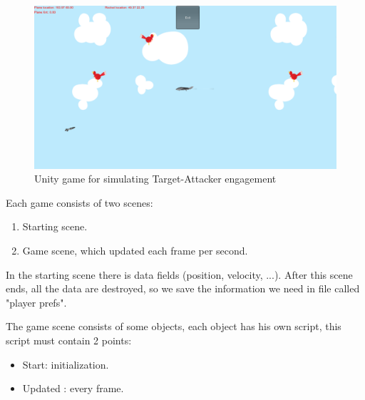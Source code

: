  \begin{figure}[H]
 	\centering
 	\includegraphics[scale = 0.35]{fig/unityGame.PNG}
 	\caption{Unity game for simulating Target-Attacker engagement}
 	\label{UnityGame}
 \end{figure}
 

Each game consists of two scenes:

\begin{enumerate}
	\item Starting scene.
	\item Game scene, which updated each frame per second.
\end{enumerate}

In the starting scene there is data fields (position, velocity, ...). After this scene ends, all the data are destroyed, so we save the information we need in file called "player prefs".

The game scene consists of some objects, each object has his own script, this script must contain 2 points:
\begin{itemize}
	\item Start: initialization.
	\item Updated : every frame.
\end{itemize} 

